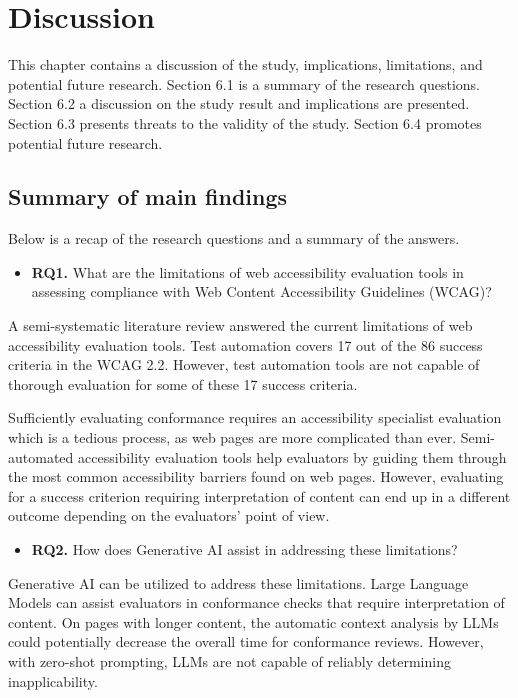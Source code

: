 \chapter{Discussion\label{discussion}}

This chapter contains a discussion of the study, implications, limitations, and potential future research. Section 6.1 is a summary of the research questions. Section 6.2 a discussion on the study result and implications are presented. Section 6.3 presents threats to the validity of the study. Section 6.4 promotes potential future research.

\section{Summary of main findings}

Below is a recap of the research questions and a summary of the answers.

\begin{itemize}
    \item \textbf{RQ1.} What are the limitations of web accessibility evaluation tools in assessing compliance with Web Content Accessibility Guidelines (WCAG)?
\end{itemize}

    A semi-systematic literature review answered the current limitations of web accessibility evaluation tools. Test automation covers 17 out of the 86 success criteria in the WCAG 2.2. However, test automation tools are not capable of thorough evaluation for some of these 17 success criteria. 

    Sufficiently evaluating conformance requires an accessibility specialist evaluation which is a tedious process, as web pages are more complicated than ever. Semi-automated accessibility evaluation tools help evaluators by guiding them through the most common accessibility barriers found on web pages. However, evaluating for a success criterion requiring interpretation of content can end up in a different outcome depending on the evaluators' point of view.
    
\begin{itemize}
    \item \textbf{RQ2.} How does Generative AI assist in addressing these limitations?
\end{itemize}

    Generative AI can be utilized to address these limitations. Large Language Models can assist evaluators in conformance checks that require interpretation of content. On pages with longer content, the automatic context analysis by LLMs could potentially decrease the overall time for conformance reviews. However, with zero-shot prompting, LLMs are not capable of reliably determining inapplicability.


